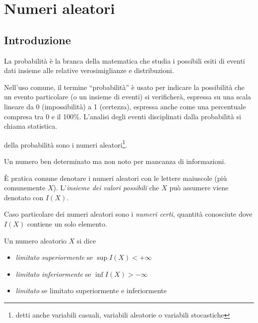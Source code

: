 %
%
%
%
\chapter{Numeri aleatori}
\section{Introduzione}
La probabilità è la branca della matematica che studia i possibili esiti di eventi dati insieme alle relative verosimiglianze e distribuzioni.

Nell'uso comune, il termine ``probabilità'' è usato per indicare la possibilità che un evento particolare (o un insieme di eventi) si verificherà, espressa su una scala lineare da 0 (impossibilità) a 1 (certezza), espressa anche come una percentuale compresa tra 0 e il 100\%.
L'analisi degli eventi disciplinati dalla probabilità si chiama statistica.

 della probabilità sono i numeri aleatori\footnote{detti anche variabili casuali, variabili aleatorie o variabili stocastiche}.

\begin{definition}
  Un numero ben determinato ma non noto per mancanza di informazioni.
\end{definition}
È pratica comune denotare i numeri aleatori con le lettere maiuscole (più comunemente $X$).
L'\emph{insieme dei valori possibili} che $X$ può assumere viene denotato con $I(X)$.

Caso particolare dei numeri aleatori sono i \emph{numeri certi}, quantità conosciute dove $I(X)$ contiene un solo elemento.

\begin{definition}
  Un numero aleatorio $X$ si dice
  \begin{itemize}
  \item \emph{limitato superiormente} se \( \sup I(X) < + \infty \)
  \item \emph{limitato inferiormente} se \( \inf I(X) > - \infty \)
  \item \emph{limitato} se limitato superiormente e inferiormente
  \end{itemize}
\end{definition}

